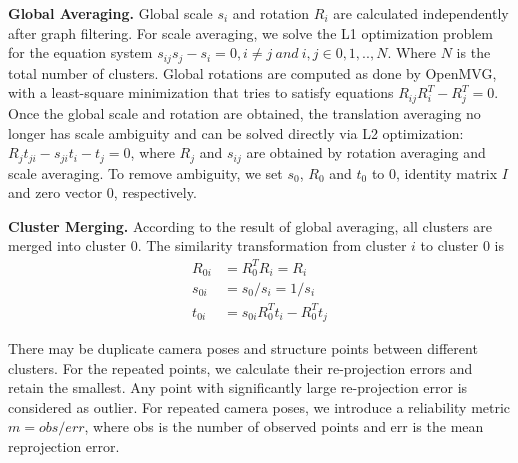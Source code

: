 \documentclass[runningheads]{llncs}
\begin{document}
\textbf{Global Averaging.} Global scale $s_i$ and rotation $R_i$ are calculated independently after graph filtering. For scale averaging, we solve the L1 optimization problem for the equation system $s_{ij}s_{j}-s_i=0, i\neq j \ and \ i,j \in0,1,..,N$. Where $N$ is the total number of clusters. Global rotations are computed as done by OpenMVG\cite{mvg}, with a least-square minimization that tries to satisfy equations $R_{ij}R^T_i - R^T_j=0$. Once the global scale and rotation are obtained, the translation averaging no longer has scale ambiguity and can be solved directly via L2 optimization: $R_jt_{ji}-s_{ji}t_i-t_j=0$, where $R_j$ and $s_{ij}$ are obtained by rotation averaging and scale averaging. To remove ambiguity, we set $s_0$, $R_0$ and $t_0$ to 0, identity matrix $I$ and zero vector $0$, respectively.


\textbf{Cluster Merging.} 
According to the result of global averaging, all clusters are merged into cluster $0$. The similarity transformation from cluster $i$ to cluster $0$ is
\begin{align}
R_{0i} &= R^T_0R_i = R_i \\
s_{0i} &= s_0/s_i = 1/s_i \\
t_{0i} &= s_{0i}R_0^Tt_i-R_0^Tt_j
\end{align} 

There may be duplicate camera poses and structure points between different clusters. For the repeated points, we calculate their re-projection errors and retain the smallest. Any point with significantly large re-projection error is considered as outlier. For repeated camera poses, we introduce a reliability metric $m = obs/err$, where obs is the number of observed points and err is the mean reprojection error.
\end{document}
